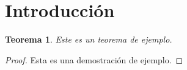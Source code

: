 \documentclass{article}
\newtheorem{theorem}{Teorema}[section] %
\begin{document}
\section{Introducción}
\begin{theorem}
Este es un teorema de ejemplo.
\end{theorem}
\begin{proof}
Esta es una demostración de ejemplo.
\end{proof}
\end{document}
